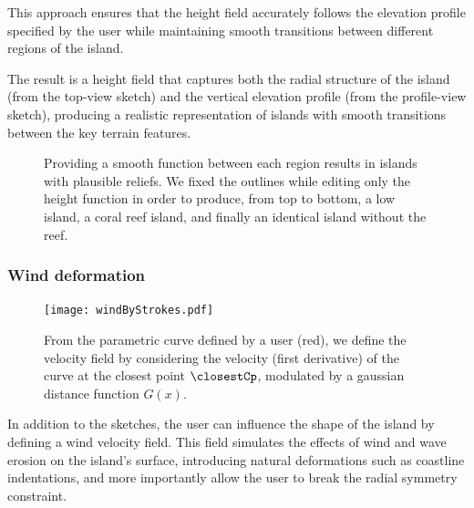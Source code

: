 This approach ensures that the height field accurately follows the elevation profile specified by the user while maintaining smooth transitions between different regions of the island.

The result is a height field that captures both the radial structure of the island (from the top-view sketch) and the vertical elevation profile (from the profile-view sketch), producing a realistic representation of islands with smooth transitions between the key terrain features.

\begin{figure}[H]
    \caption{Providing a smooth function between each region results in islands with plausible reliefs. We fixed the outlines while editing only the height function in order to produce, from top to bottom, a low island, a coral reef island, and finally an identical island without the reef. }
    \label{fig:coral-island_procedural-smooth-heights}
\end{figure}





\subsubsection{Wind deformation}
\label{sec:coral-island_wind-deformation}

\begin{figure}[H]
    \centering
    \texttt{[image: windByStrokes.pdf]}
    \caption{From the parametric curve defined by a user (red), we define the velocity field by considering the velocity (first derivative) of the curve at the closest point $\closestCp$, modulated by a gaussian distance function $G(x)$. }
    \label{fig:coral-island_wind-from-strokes}
\end{figure}

In addition to the sketches, the user can influence the shape of the island by defining a wind velocity field. This field simulates the effects of wind and wave erosion on the island's surface, introducing natural deformations such as coastline indentations, and more importantly allow the user to break the radial symmetry constraint.

